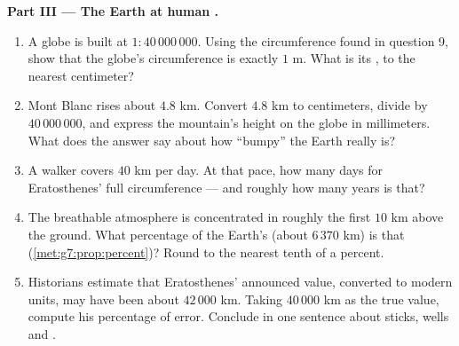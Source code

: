 \begin{problem}
\medskip
\noindent\textbf{Part III --- The Earth at human .}
\begin{enumerate}[resume]
  \item A globe is built at  $1 : 40\,000\,000$. Using the
        circumference found in question 9, show that the
        globe's circumference is exactly $1$ m. What is its
        , to the nearest centimeter?
  \item Mont Blanc rises about $4.8$ km. Convert $4.8$ km to
        centimeters, divide by $40\,000\,000$, and express the
        mountain's height on the globe in millimeters. What does
        the answer say about how ``bumpy'' the Earth really is?
  \item A walker covers $40$ km per day. At that pace, how many
        days for Eratosthenes' full circumference --- and
        roughly how many years is that?
  \item The breathable atmosphere is concentrated in roughly the
        first $10$ km above the ground. What percentage of the
        Earth's  (about $6\,370$ km) is that
        (\cref{met:g7:prop:percent})? Round to the nearest
        tenth of a percent.
  \item Historians estimate that Eratosthenes' announced value,
        converted to modern units, may have been about
        $42\,000$ km. Taking $40\,000$ km as the true value,
        compute his percentage of error. Conclude in one
        sentence about sticks, wells and .
\end{enumerate}
\end{problem}
